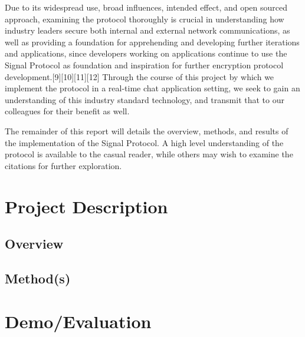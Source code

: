 \documentclass[12pt]{article}
\begin{document}
\par %
Due to its widespread use, broad influences, intended effect, and open sourced approach, examining the protocol thoroughly is crucial in understanding how industry leaders secure both internal and external network communications, as well as providing a foundation for apprehending and developing further iterations and applications, since developers working on applications continue to use the Signal Protocol as foundation and inspiration for further encryption protocol development.[9][10][11][12] Through the course of this project by which we implement the protocol in a real-time chat application setting, we seek to gain an understanding of this industry standard technology, and transmit that to our colleagues for their benefit as well. 

\par%
The remainder of this report will details the overview, methods, and results of the implementation of the Signal Protocol. A high level understanding of the protocol is available to the casual reader, while others may wish to examine the citations for further exploration.


\newpage
\section{Project Description}

\subsection{Overview}
\par  %

\subsection{Method(s)}
\par %

\newpage
\section{Demo/Evaluation}
\end{document}
